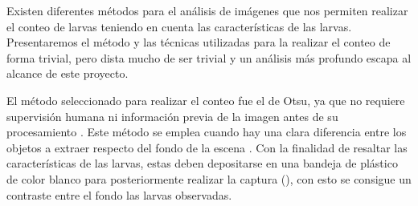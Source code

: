 Existen diferentes métodos para el análisis de imágenes que nos permiten realizar el conteo de
larvas teniendo en cuenta las características de las larvas. Presentaremos el método y las técnicas
utilizadas para la realizar el conteo de forma trivial, pero dista mucho de ser trivial y un
análisis más profundo escapa al alcance de este proyecto.

El método seleccionado para realizar el conteo fue el de Otsu, ya que no requiere supervisión
humana ni información previa de la imagen antes de su procesamiento \cite{santillan2008deteccion}.
Este método se emplea cuando hay una clara diferencia entre los objetos a extraer respecto del
fondo de la escena \citep{santillan2008deteccion}. Con la finalidad de resaltar las características
de las larvas, estas deben depositarse en una bandeja de plástico de color blanco para
posteriormente realizar la captura (), con esto se consigue
un contraste entre el fondo las larvas observadas.

